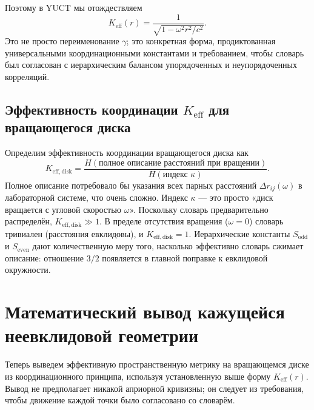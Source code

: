 \documentclass[12pt,a4paper]{article}
\newcommand{\Sodd}{S_{\mathrm{odd}}}
\newcommand{\Seven}{S_{\mathrm{even}}}
\begin{document}
	Поэтому в YUCT мы отождествляем
	\[
	\boxed{K_{\mathrm{eff}}(r) = \frac{1}{\sqrt{1 - \omega^2 r^2/c^2}}}.
	\]
	Это не просто переименование \(\gamma\); это конкретная форма, продиктованная универсальными координационными константами и требованием, чтобы словарь был согласован с иерархическим балансом упорядоченных и неупорядоченных корреляций.
	
	\subsection{Эффективность координации \(K_{\mathrm{eff}}\) для вращающегося диска}
	\label{subsec:keff-disk}
	
	Определим эффективность координации вращающегося диска как
	\[
	K_{\mathrm{eff,disk}} = \frac{H(\text{полное описание расстояний при вращении})}{H(\text{индекс } \kappa)}.
	\]
	Полное описание потребовало бы указания всех парных расстояний \(\Delta r_{ij}(\omega)\) в лабораторной системе, что очень сложно. Индекс \(\kappa\) — это просто «диск вращается с угловой скоростью \(\omega\)». Поскольку словарь предварительно распределён, \(K_{\mathrm{eff,disk}} \gg 1\). В пределе отсутствия вращения (\(\omega = 0\)) словарь тривиален (расстояния евклидовы), и \(K_{\mathrm{eff,disk}} = 1\). Иерархические константы \(\Sodd\) и \(\Seven\) дают количественную меру того, насколько эффективно словарь сжимает описание: отношение \(3/2\) появляется в главной поправке к евклидовой окружности.
	
	\section{Математический вывод кажущейся неевклидовой геометрии}
	\label{sec:derivation}
	
	Теперь выведем эффективную пространственную метрику на вращающемся диске из координационного принципа, используя установленную выше форму \(K_{\mathrm{eff}}(r)\). Вывод не предполагает никакой априорной кривизны; он следует из требования, чтобы движение каждой точки было согласовано со словарём.
	
\end{document}
